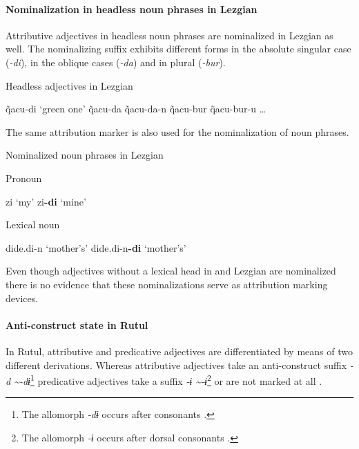 \paragraph*{Nominalization in headless noun phrases in Lezgian}
Attributive adjectives in headless noun phrases are nominalized in Lezgian as well. The nominalizing suffix exhibits different forms in the absolute singular case (\textit{-di}), in the oblique cases (\textit{-da}) and in plural (\textit{-bur}).
\begin{exe}
\settowidth{}
\ex \rm{Headless adjectives in Lezgian \citep[110]{haspelmath1993}}
\begin{xlist}
\ex	q̃acu-di		\rm{‘green one’}	
\ex	q̃acu-da						
\ex	q̃acu-da-n						
\ex	q̃acu-bur						
\ex	q̃acu-bur-u					
\ex \dots
\end{xlist}
\end{exe}
The same attribution marker is also used for the nominalization of noun phrases.
\begin{exe}
\settowidth{}
\ex \rm{Nominalized noun phrases in Lezgian \citep[110]{haspelmath1993}}
\begin{xlist}
\ex \rm{Pronoun} 
\begin{xlist}
\ex	zi			\rm{‘my’}		
\ex	zi\textbf{-di}	\rm{‘mine’}	
\end{xlist}
\ex \rm{Lexical noun}
\begin{xlist}
\ex	dide.di-n			\rm{‘mother's’}	
\ex 	dide.di-n\textbf{-di}	\rm{‘mother's’}	
\end{xlist}
\end{xlist}
\end{exe}
Even though adjectives without a lexical head in  and Lezgian are nominalized there is no evidence that these nominalizations serve as attribution marking devices.

\paragraph*{Anti\hyp{}construct state in Rutul}
In Rutul, attributive and predicative adjectives are differentiated by means of two different derivations. Whereas attributive adjectives take an anti\hyp{}construct suffix \textit{-d \textasciitilde-dɨ}\footnote{The allomorph \textit{-dɨ} occurs after consonants \citep[224]{alekseev1994a}.} predicative adjectives take a suffix \textit{-ɨ \textasciitilde-ɨ}\footnote{The allomorph \textit{-ɨ} occurs after dorsal consonants \citep[224]{alekseev1994a}.} or are not marked at all \citep[224]{alekseev1994a}.

